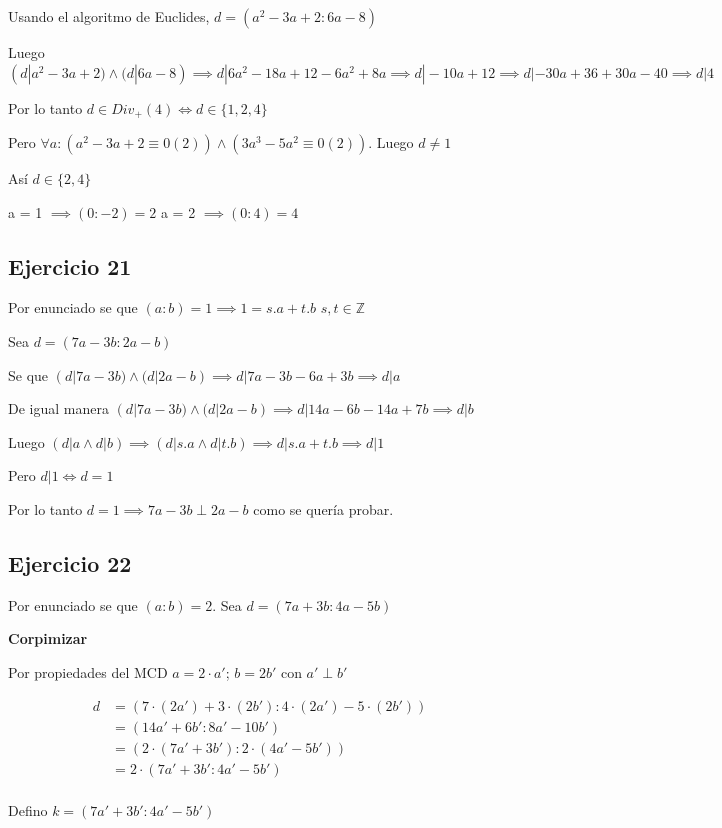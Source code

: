 Usando el algoritmo de Euclides, $ d = (a^2-3a+2:6a-8) $

Luego $ (d|a^2-3a+2) \wedge (d|6a-8) \implies d|6a^2-18a+12-6a^2+8a \implies d|-10a+12 \implies d|-30a+36+30a-40 \implies d|4$

Por lo tanto $ d \in Div_+(4) \iff d \in \{ 1,2,4 \} $

Pero $ \forall a: (a^2-3a+2 \equiv 0 (2)) \wedge (3a^3-5a^2 \equiv 0 (2))$. Luego $d \neq 1$

Así $ d \in \{ 2,4 \}$

a = 1 $ \implies (0:-2) = 2 $
a = 2 $ \implies (0:4) = 4 $

\subsection{Ejercicio 21}
Por enunciado se que $ (a:b) = 1 \implies 1 = s.a + t.b$  $s,t \in \mathbb{Z}$

Sea $ d = (7a-3b:2a-b) $

Se que $ (d| 7a-3b) \wedge (d|2a-b) \implies d|7a-3b-6a+3b \implies d|a $

De igual manera $ (d| 7a-3b) \wedge (d|2a-b) \implies d|14a-6b-14a+7b \implies d|b $

Luego $ (d|a \wedge d|b) \implies (d|s.a \wedge d|t.b) \implies d|s.a + t.b \implies d|1$

Pero $ d|1 \iff d=1 $

Por lo tanto $ d=1 \implies 7a-3b \perp 2a-b $ como se quería probar.

\subsection{Ejercicio 22}
Por enunciado se que $ (a:b) = 2 $. Sea $ d = (7a+3b:4a-5b) $

\textbf{Corpimizar}

Por propiedades del MCD $ a = 2\cdot a' $; $ b = 2b' $ con $ a' \perp b' $

\begin{align*}
    d &= (7\cdot (2a') + 3\cdot(2b'):4 \cdot (2a')-5\cdot (2b')) \\
    &= (14a' + 6b':8a' - 10b') \\
    &= (2\cdot (7a' + 3b'):2\cdot (4a' - 5b')) \\
    &= 2 \cdot (7a' + 3b':4a' - 5b') \\
\end{align*}

Defino $ k = (7a' + 3b':4a' - 5b') $

